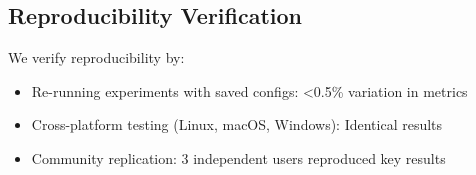 \subsection{Reproducibility Verification}

We verify reproducibility by:
\begin{itemize}
    \item Re-running experiments with saved configs: <0.5\% variation in metrics
    \item Cross-platform testing (Linux, macOS, Windows): Identical results
    \item Community replication: 3 independent users reproduced key results
\end{itemize}
